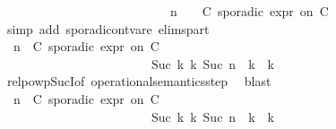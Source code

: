 \begin{isabellebody}
\ \ \ \ \ \ \ \ \ \ \ \ \ \ \ \ \ \ \ \ \ \ \ \ \ \ {\isasymhookrightarrow}{\isacharparenleft}{\isasymGamma}{\isacharcomma}\ n\ {\isasymturnstile}\ {\isasymPsi}\ {\isasymtriangleright}\ {\isacharparenleft}{\isacharparenleft}C\ sporadic{\isasymsharp}\ {\isasymtau}\isactrlsub e\isactrlsub x\isactrlsub p\isactrlsub r\ on\ C\ {\isacharhash}\ {\isasymPhi}{\isacharparenright}{\isacharparenright}{\isacartoucheclose}\isanewline
\ \ \ \ \ \ \ \ \ \ \ \ \isamarkupfalse%
\ {\isacharparenleft}simp\ add{\isacharcolon}\ sporadic{\isacharunderscore}on{\isacharunderscore}tvar{\isacharunderscore}e{}\ elims{\isacharunderscore}part{\isacharparenright}\isanewline
\ \ \ \ \ \ \ \ \ \ \isamarkupfalse%
\ \isamarkupfalse%
\ {\isacartoucheopen}{\isacharparenleft}{\isacharparenleft}{\isasymGamma}{\isacharcomma}\ n\ {\isasymturnstile}\ {\isacharparenleft}{\isacharparenleft}C\ sporadic{\isasymsharp}\ {\isasymtau}\isactrlsub e\isactrlsub x\isactrlsub p\isactrlsub r\ on\ C\ {\isacharhash}\ {\isasymPsi}{\isacharparenright}\ {\isasymtriangleright}\ {\isasymPhi}{\isacharparenright}\isanewline
\ \ \ \ \ \ \ \ \ \ \ \ \ \ \ \ \ \ \ \ \ \ \ \ {\isasymhookrightarrow}\isactrlbsup Suc\ k\isactrlesup \ {\isacharparenleft}{\isasymGamma}\isactrlsub k{\isacharcomma}\ Suc\ n\ {\isasymturnstile}\ {\isasymPsi}\isactrlsub k\ {\isasymtriangleright}\ {\isasymPhi}\isactrlsub k{\isacharparenright}{\isacharparenright}{\isacartoucheclose}\isanewline
\ \ \ \ \ \ \ \ \ \ \ \ \isamarkupfalse%
\ relpowp{\isacharunderscore}Suc{\isacharunderscore}I{}{\isacharbrackleft}of\ {\isacartoucheopen}operational{\isacharunderscore}semantics{\isacharunderscore}step{\isacartoucheclose}{\isacharbrackright}\ \isamarkupfalse%
\ blast\isanewline
\ \ \ \ \ \ \ \ \ \ \isamarkupfalse%
\ {\isacharasterisk}\ \isamarkupfalse%
\ {\isacartoucheopen}{\isacharparenleft}{\isacharparenleft}{\isasymGamma}{\isacharcomma}\ n\ {\isasymturnstile}\ {\isacharparenleft}{\isacharparenleft}C\ sporadic{\isasymsharp}\ {\isasymtau}\isactrlsub e\isactrlsub x\isactrlsub p\isactrlsub r\ on\ C\ {\isacharhash}\ {\isasymPsi}{\isacharparenright}\ {\isasymtriangleright}\ {\isasymPhi}{\isacharparenright}\isanewline
\ \ \ \ \ \ \ \ \ \ \ \ \ \ \ \ \ \ \ \ \ \ \ \ {\isasymhookrightarrow}\isactrlbsup Suc\ k\isactrlesup \ {\isacharparenleft}{\isasymGamma}\isactrlsub k{\isacharcomma}\ Suc\ n\ {\isasymturnstile}\ {\isasymPsi}\isactrlsub k\ {\isasymtriangleright}\ {\isasymPhi}\isactrlsub k{\isacharparenright}{\isacharparenright}\isanewline

\end{isabellebody}
